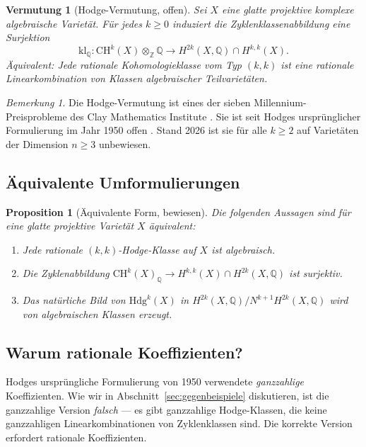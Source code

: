\documentclass[12pt,a4paper]{amsart}
\newtheorem{proposition}[theorem]{Proposition}
\newtheorem{vermutung}[theorem]{Vermutung}
\theoremstyle{definition}
\theoremstyle{remark}
\newtheorem{bemerkung}[theorem]{Bemerkung}
\begin{document}
\begin{vermutung}[Hodge-Vermutung, offen]
\label{verm:hodge}
Sei $X$ eine glatte projektive komplexe algebraische Varietät. Für jedes $k \ge 0$
induziert die Zyklenklassenabbildung eine Surjektion
\[
  \mathrm{kl}_\mathbb{Q}: \mathrm{CH}^k(X) \otimes_\mathbb{Z} \mathbb{Q}
  \longrightarrow
  H^{2k}(X, \mathbb{Q}) \cap H^{k,k}(X).
\]
Äquivalent: Jede rationale Kohomologieklasse vom Typ $(k,k)$ ist eine rationale
Linearkombination von Klassen algebraischer Teilvarietäten.
\end{vermutung}

\begin{bemerkung}
\label{bem:millennium}
Die Hodge-Vermutung ist eines der sieben Millennium-Preisprobleme des Clay Mathematics
Institute \cite{clay2000}. Sie ist seit Hodges ursprünglicher Formulierung im Jahr
1950 offen \cite{hodge1950}. Stand 2026 ist sie für alle $k \ge 2$ auf Varietäten
der Dimension $n \ge 3$ unbewiesen.
\end{bemerkung}

\subsection{Äquivalente Umformulierungen}

\begin{proposition}[Äquivalente Form, bewiesen]
Die folgenden Aussagen sind für eine glatte projektive Varietät $X$ äquivalent:
\begin{enumerate}[label=(\roman*)]
\item Jede rationale $(k,k)$-Hodge-Klasse auf $X$ ist algebraisch.
\item Die Zyklenabbildung $\mathrm{CH}^k(X)_\mathbb{Q} \to H^{k,k}(X) \cap H^{2k}(X,\mathbb{Q})$
  ist surjektiv.
\item Das natürliche Bild von $\mathrm{Hdg}^k(X)$ in
  $H^{2k}(X, \mathbb{Q}) / N^{k+1} H^{2k}(X,\mathbb{Q})$ wird von algebraischen
  Klassen erzeugt.
\end{enumerate}
\end{proposition}

\subsection{Warum rationale Koeffizienten?}

Hodges ursprüngliche Formulierung von 1950 verwendete \emph{ganzzahlige} Koeffizienten.
Wie wir in Abschnitt~\ref{sec:gegenbeispiele} diskutieren, ist die ganzzahlige Version
\emph{falsch} — es gibt ganzzahlige Hodge-Klassen, die keine ganzzahligen Linearkombinationen
von Zyklenklassen sind. Die korrekte Version erfordert rationale Koeffizienten.
\end{document}
